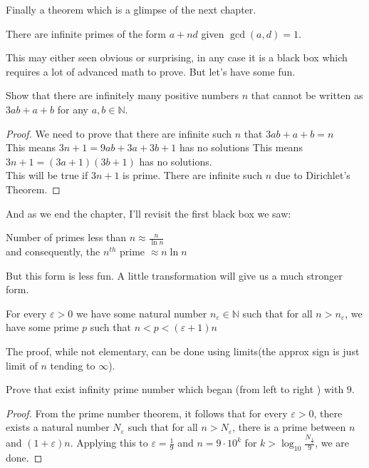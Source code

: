 Finally a theorem which is a glimpse of the next chapter.
\begin{theorem}
    There are infinite primes of the form $a+nd$ given $\gcd(a,d)=1$.
\end{theorem}
This may either seen obvious or surprising, in any case it is a black box which requires a lot of advanced math to prove. But let's have some fun.\\
\begin{example}
    Show that there are infinitely many positive numbers $n$ that cannot be written as $3ab + a + b$ for any $a, b \in \mathbb{N}$.
\end{example}
\begin{proof}
We need to prove that there are infinite such $n$ that $3ab+a+b=n$\\
This means $3n+1=9ab+3a+3b+1$ has no solutions
This means $3n+1=(3a+1)(3b+1)$ has no solutions.\\
This will be true if $3n+1$ is prime. There are infinite such $n$ due to Dirichlet's Theorem.
\end{proof}
And as we end the chapter, I'll revisit the first black box we saw:\\
\begin{theorem}
    Number of primes less than $n \approx \frac{n}{\ln{n}}$ \\
    and consequently, the $n^{th}$ prime $ \approx n \ln{n}$
\end{theorem}
But this form is less fun. A little transformation will give us a much stronger form.\\
\begin{theorem}
    For every $\varepsilon > 0$ we have some natural number $n_{\varepsilon} \in \mathbb{N}$ such that for all $n>n_{\varepsilon}$, we have some prime $p$ such that $n<p<(\varepsilon + 1)n$
\end{theorem}
The proof, while not elementary, can be done using limits(the approx sign is just limit of $n$ tending to $\infty$).\\
\begin{example}
    Prove that exist infinity prime number which began (from left to right ) with $9$.
\end{example}
\begin{proof}
    From the prime number theorem, it follows that for every $\varepsilon > 0$, there exists a natural number $N_\varepsilon$ such that for all $n > N_\varepsilon$, there is a prime between $n$ and $(1 + \varepsilon) n$. Applying this to $\varepsilon = \frac{1}{9}$ and $n = 9 \cdot 10^k$ for $k > \log_{10} \frac{N_{\frac{1}{9}}}{9}$, we are done.
\end{proof}
